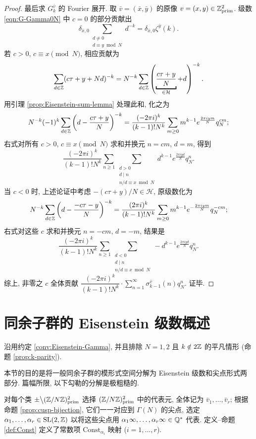 \begin{proof}
	最后求 $G^{\bar{v}}_k$ 的 Fourier 展开. 取 $\bar{v} = (\bar{x},\bar{y})$ 的原像 $v=(x,y) \in \mathbb{Z}^2_\text{prim}$. 级数 \eqref{eqn:G-Gamma0N} 中 $c=0$ 的部分贡献出
	\[ \delta_{\bar{x},0} \sum_{\substack{d \neq 0 \\ d \equiv y \bmod N}} d^{-k} = \delta_{\bar{x},0} \zeta^{\bar{y}}(k). \]
	 若 $c > 0$, $c \equiv x \pmod N$, 相应贡献为
	\[ \sum_{d \in \Z} (c\tau + y + Nd)^{-k} = N^{-k} \sum_{d \in \Z} \left( \underbracket{\frac{c\tau + y}{N}}_{\in \mathcal{H}} + d \right)^{-k}. \]
	用引理 \ref{prop:Eisenstein-sum-lemma} 处理此和, 化之为
	\[ N^{-k} (-1)^k \sum_{d \in \mathbb{Z}} \left( d - \frac{c\tau + y}{N} \right)^{-k} = \frac{(-2\pi i)^k}{(k-1)! N^k} \sum_{m \geq 0} m^{k-1} e^{\frac{2\pi iym}{N}} q_N^{cm}; \]
	右式对所有 $c > 0$, $c \equiv x \pmod N$ 求和并换元 $n = cm$, $d=m$, 得到
	\[ \frac{(-2\pi i)^k}{(k-1)! N^k} \sum_{n \geq 1} \sum_{\substack{d > 0 \\ d \mid n \\ n/d \equiv x \bmod N }} d^{k-1} e^{\frac{2\pi iyd}{N}} q_N^n. \]
	当 $c < 0$ 时, 上述论证中考虑 $-(c\tau + y)/N \in \mathcal{H}$, 原级数化为
	\[ N^{-k} \sum_{d \in \mathbb{Z}} \left( d - \frac{-c\tau - y}{N} \right)^{-k} = \frac{(2\pi i)^k}{(k-1)! N^k} \sum_{m \geq 0} m^{k-1} e^{-\frac{2\pi iym}{N}} q_N^{-cm}; \]
	右式对这些 $c$ 求和并换元 $n=-cm$, $d=-m$, 结果是
	\[ \frac{(-2\pi i)^k}{(k-1)! N^k} \sum_{n \geq 1} \sum_{\substack{d < 0 \\ d \mid n \\ n/d \equiv x \bmod N }} -d^{k-1} e^{\frac{2\pi iyd}{N}} q_N^n. \]
	综上, 非零之 $c$ 全体贡献 $\dfrac{(-2\pi i)^k}{(k-1)! N^k} \cdot \sum_{n=1}^\infty \sigma^{\bar{v}}_{k-1}(n) q_N^n$. 证毕.
\end{proof}

\section{同余子群的 Eisenstein 级数概述}\label{sec:Eisenstein-congruence-subgroup2}
沿用约定 \ref{conv:Eisenstein-Gamma}, 并且排除 $N = 1, 2$ 且 $k \notin 2\mathbb{Z}$ 的平凡情形 (命题 \ref{prop:k-parity}).

本节的目的是将一般同余子群的模形式空间分解为 Eisenstein 级数和尖点形式两部分. 篇幅所限, 以下勾勒的分解是极粗糙的.

对每个类 $\pm \big\backslash (\mathbb{Z}/N\mathbb{Z})^2_\text{prim}$ 选择 $(\mathbb{Z}/N\mathbb{Z})^2_\text{prim}$ 中的代表元, 全体记为 $\bar{v}_1, \ldots, \bar{v}_r$; 根据命题 \ref{prop:cusp-bijection}, 它们一一对应到 $\Gamma(N)$ 的尖点, 选定 $\alpha_1, \ldots, \alpha_r \in \operatorname{SL}(2,\mathbb{Z})$ 以将这些尖点用 $\alpha_1 \infty, \ldots, \alpha_r \infty \in \mathbb{Q}^*$ 代表. 定义--命题 \ref{def:Const} 定义了常数项 $\mathrm{Const}_{\alpha_i}$ 映射 ($i = 1, \ldots, r$).

